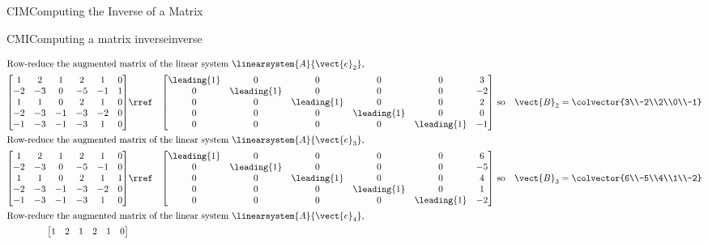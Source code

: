 \begin{subsect}{CIM}{Computing the Inverse of a Matrix}
\begin{example}{CMI}{Computing a matrix inverse}{inverse}
\begin{para}
\begin{align*}
%
\intertext{Row-reduce the augmented matrix of the linear system $\linearsystem{A}{\vect{e}_2}$,}
\begin{bmatrix}
 1 & 2 & 1 & 2 & 1 & 0\\
 -2 & -3 & 0 & -5 & -1 & 1\\
 1 & 1 & 0 & 2 & 1 & 0\\
 -2 & -3 & -1 & -3 & -2 & 0\\
 -1 & -3 & -1 & -3 & 1 & 0
\end{bmatrix}
%
&\rref&
%
\begin{bmatrix}
\leading{1} & 0 & 0 & 0 & 0 & 3\\
0 & \leading{1} & 0 & 0 & 0 & -2\\
0 & 0 & \leading{1} & 0 & 0 & 2\\
0 & 0 & 0 & \leading{1} & 0 & 0\\
0 & 0 & 0 & 0 & \leading{1} & -1
\end{bmatrix}
%
&\text{ so}&
%
\vect{B}_2=\colvector{3\\-2\\2\\0\\-1}\\
%
\intertext{Row-reduce the augmented matrix of the linear system $\linearsystem{A}{\vect{e}_3}$,}
\begin{bmatrix}
 1 & 2 & 1 & 2 & 1 & 0\\
 -2 & -3 & 0 & -5 & -1 & 0\\
 1 & 1 & 0 & 2 & 1 & 1\\
 -2 & -3 & -1 & -3 & -2 & 0\\
 -1 & -3 & -1 & -3 & 1 & 0
\end{bmatrix}
%
&\rref&
%
\begin{bmatrix}
\leading{1} & 0 & 0 & 0 & 0 & 6\\
0 & \leading{1} & 0 & 0 & 0 & -5\\
0 & 0 & \leading{1} & 0 & 0 & 4\\
0 & 0 & 0 & \leading{1} & 0 & 1\\
0 & 0 & 0 & 0 & \leading{1} & -2
\end{bmatrix}
%
&\text{ so}&
%
\vect{B}_3=\colvector{6\\-5\\4\\1\\-2}\\
%
\intertext{Row-reduce the augmented matrix of the linear system $\linearsystem{A}{\vect{e}_4}$,}
\begin{bmatrix}
 1 & 2 & 1 & 2 & 1 & 0\\

\end{bmatrix}
\end{align*}
\end{para}
\end{example}
\end{subsect}
